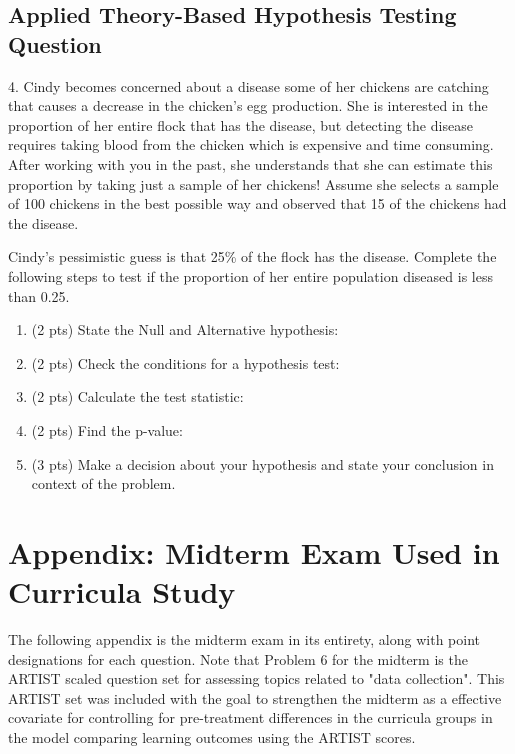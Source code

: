\documentclass[11pt]{isuthesis}\usepackage[]{graphicx}\usepackage[]{color}
\begin{document}
\begin{appendices}
\subsection{Applied Theory-Based Hypothesis Testing Question}

4. Cindy becomes concerned about a disease some of her chickens are catching that causes a decrease in the chicken's egg production.  She is interested in the proportion of her entire flock that has the disease, but detecting the disease requires taking blood from the chicken which is expensive and time consuming.  After working with you in the past, she understands that she can estimate this proportion by taking just a sample of her chickens! Assume she selects a sample of 100 chickens in the best possible way and observed that 15 of the chickens had the disease.

Cindy's pessimistic guess is that 25\% of the flock has the disease.  Complete the following steps to test if the proportion of her entire population diseased is less than 0.25.  
\begin{enumerate} 
\item (2 pts) State the Null and Alternative hypothesis:
\item (2 pts) Check the conditions for a hypothesis test:
\item (2 pts) Calculate the test statistic:
\item (2 pts) Find the p-value:
\item (3 pts) Make a decision about your hypothesis and state your conclusion in context of the problem. 
\end{enumerate}


\section{Appendix: Midterm Exam Used in Curricula Study}
\label{appMidtermExamQuestions}

The following appendix is the midterm exam in its entirety, along with point designations for each question.  Note that Problem 6 for the midterm is the ARTIST scaled question set for assessing topics related to "data collection". This ARTIST set was included with the goal to strengthen the midterm as a effective covariate for controlling for pre-treatment differences in the curricula groups in the model comparing learning outcomes using the ARTIST scores. 




\end{appendices}
\end{document}
